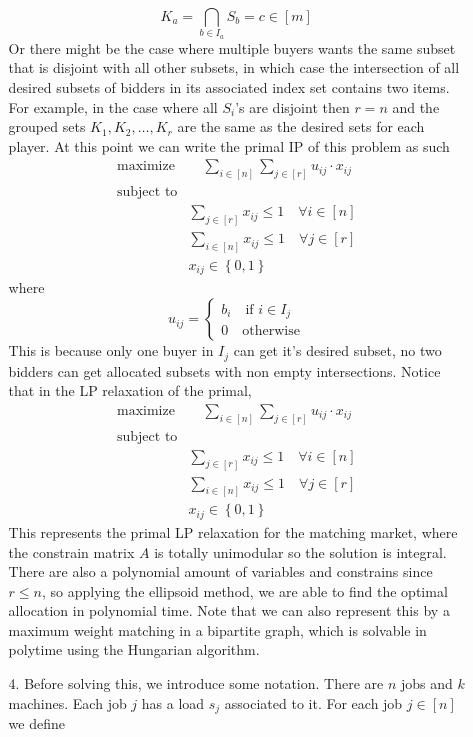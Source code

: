 \documentclass[12pt]{article}
\newcommand\set[1]{\left\lbrace #1 \right\rbrace}
\begin{document}
\begin{itemize}
\begin{itemize}
		\[K_a  = \bigcap_{b \in I_a} S_b = c \in [m] \]
		Or there might be the case where multiple buyers wants the same subset that is disjoint with all other subsets, in which case 
		the intersection of all desired subsets of bidders in its associated index set contains two items. For example, in the case where all $S_i$'s are disjoint then $r = n$ and the grouped sets $K_1, K_2,\ldots, K_r$ are the same as the desired sets for each player. 
		At this point we can write the primal IP of this problem as such 
		\begin{align*}
			\text{maximize} &\quad \sum_{i \in [n]} \sum_{j \in [r]}u_{ij}\cdot x_{ij}\\
				\text{subject to} \\
				&\sum_{j \in [r]} x_{ij} \leq 1 \quad \forall i \in [n]\\
				&\sum_{i \in [n]} x_{ij} \leq 1 \quad \forall j \in [r]\\
				&x_{ij} \in \set{0,1}
		\end{align*}
		where 
		\[
			u_{ij} = \begin{cases}
				b_i \quad \text{if } i \in I_j\\
				0 \quad \text{otherwise}
			\end{cases}
		\]
		This is because only one buyer in $I_j$ can get it's desired subset, no two bidders can get allocated subsets with non empty intersections. Notice that in the LP relaxation of the primal,  
		\begin{align*}
			\text{maximize} &\quad \sum_{i \in [n]} \sum_{j \in [r]}u_{ij}\cdot x_{ij}\\
				\text{subject to} \\
				&\sum_{j \in [r]} x_{ij} \leq 1 \quad \forall i \in [n]\\
				&\sum_{i \in [n]} x_{ij} \leq 1 \quad \forall j \in [r]\\
				&x_{ij} \in \set{0,1}
		\end{align*}
		This represents the primal LP relaxation for the matching market, where the constrain matrix $A$ is totally unimodular so the solution is integral. There are also a polynomial amount of variables and constrains since $r \leq n$, so applying the ellipsoid method, we are able to find the optimal allocation in polynomial time. Note that we can also represent this by a maximum weight matching in a bipartite graph, which is solvable in polytime using the Hungarian algorithm. 
		\item[4.]
		Before solving this, we introduce some notation. There are $n$ jobs and $k$ machines. Each job $j$ has a load $s_j$ associated to it. For each job $j \in [n]$ we define 

\end{itemize}
\end{itemize}
\end{document}
